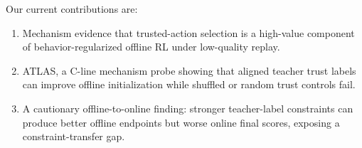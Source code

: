 Our current contributions are:

\begin{enumerate}[leftmargin=*]
  \item Mechanism evidence that trusted-action selection is a high-value component of behavior-regularized offline RL under low-quality replay.
  \item ATLAS, a C-line mechanism probe showing that aligned teacher trust labels can improve offline initialization while shuffled or random trust controls fail.
  \item A cautionary offline-to-online finding: stronger teacher-label constraints can produce better offline endpoints but worse online final scores, exposing a constraint-transfer gap.
\end{enumerate}

